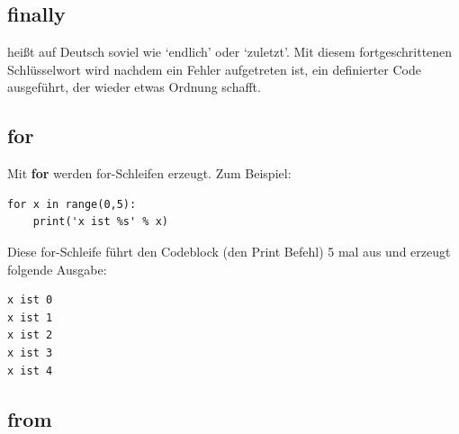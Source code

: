 \subsection*{finally}

 heißt auf Deutsch soviel wie `endlich' oder `zuletzt'. Mit diesem fortgeschrittenen Schlüsselwort wird nachdem ein Fehler aufgetreten ist, ein definierter Code ausgeführt, der wieder etwas Ordnung schafft.

\subsection*{for}

Mit \textbf{for} werden for-Schleifen erzeugt. Zum Beispiel:

\begin{Verbatim}[frame=single]
for x in range(0,5):
    print('x ist %s' % x)
\end{Verbatim}

\noindent
Diese for-Schleife führt den Codeblock (den Print Befehl) 5 mal aus und erzeugt folgende Ausgabe:

\begin{Verbatim}[frame=single]
x ist 0
x ist 1
x ist 2
x ist 3
x ist 4
\end{Verbatim}

\subsection*{from}

